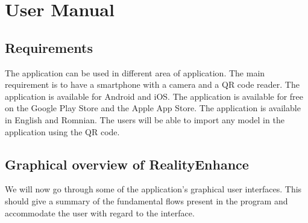 \chapter{User Manual}\label{cap:evaluation}

\section{Requirements}
The application can be used in different area of application. The main requirement is to have a smartphone with a camera and a QR code reader. The application is available for Android and iOS. The application is available for free on the Google Play Store and the Apple App Store. The application is available in English and Romnian. The users will be able to import any model in the application using the QR code.

\section{Graphical overview of RealityEnhance}
We will now go through some of the application's graphical user interfaces. This should give a summary of the fundamental flows present in the program and accommodate the user with regard to the interface.
\pagebreak

